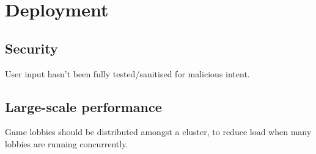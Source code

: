 \documentclass{standalone}
\begin{document}
	\section{Deployment}
		\subsection{Security}
			User input hasn't been fully tested/sanitised for malicious intent.

		\subsection{Large-scale performance}
			Game lobbies should be distributed amongst a cluster, to reduce load when many lobbies are running concurrently.
\end{document}
